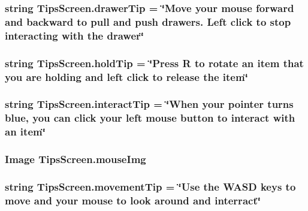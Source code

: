 \subsubsection[{\texorpdfstring{drawer\+Tip}{drawerTip}}]{\setlength{\rightskip}{0pt plus 5cm}string Tips\+Screen.\+drawer\+Tip = \char`\"{}Move your mouse forward and backward to pull and push drawers. Left click to stop interacting with the drawer\char`\"{}}\hypertarget{class_tips_screen_a84464fc0906a6a565443db1f4cf77fc1}{}\label{class_tips_screen_a84464fc0906a6a565443db1f4cf77fc1}
\subsubsection[{\texorpdfstring{hold\+Tip}{holdTip}}]{\setlength{\rightskip}{0pt plus 5cm}string Tips\+Screen.\+hold\+Tip = \char`\"{}Press R to rotate an item that you are holding and left click to release the item\char`\"{}}\hypertarget{class_tips_screen_acda577db9e1574d36cd2e67cc4de8a8b}{}\label{class_tips_screen_acda577db9e1574d36cd2e67cc4de8a8b}
\subsubsection[{\texorpdfstring{interact\+Tip}{interactTip}}]{\setlength{\rightskip}{0pt plus 5cm}string Tips\+Screen.\+interact\+Tip = \char`\"{}When your pointer turns blue, you can click your left mouse button to interact with an item\char`\"{}}\hypertarget{class_tips_screen_a63461a193396734efb0225bb199f2bc6}{}\label{class_tips_screen_a63461a193396734efb0225bb199f2bc6}
\subsubsection[{\texorpdfstring{mouse\+Img}{mouseImg}}]{\setlength{\rightskip}{0pt plus 5cm}Image Tips\+Screen.\+mouse\+Img}\hypertarget{class_tips_screen_ad27413bf25688e59257c10ada92595d4}{}\label{class_tips_screen_ad27413bf25688e59257c10ada92595d4}
\subsubsection[{\texorpdfstring{movement\+Tip}{movementTip}}]{\setlength{\rightskip}{0pt plus 5cm}string Tips\+Screen.\+movement\+Tip = \char`\"{}Use the W\+A\+SD keys to move and your mouse to look around and interract\char`\"{}}\hypertarget{class_tips_screen_a1df49222f7810e35b1b0c89272dee578}{}\label{class_tips_screen_a1df49222f7810e35b1b0c89272dee578}
